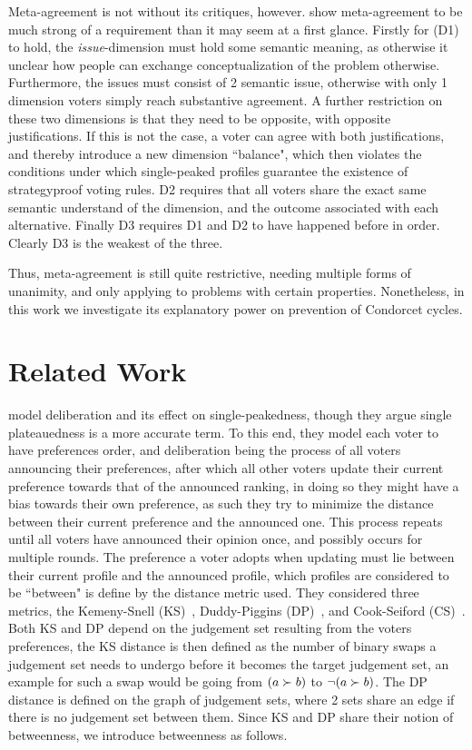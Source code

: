 Meta-agreement is not without its critiques, however. \citet{ottonelliElusiveNotionMetaagreement2013} show meta-agreement to be much strong of a requirement than it may seem at a first glance. Firstly for (D1) to hold, the \textit{issue}-dimension must hold some semantic meaning, as otherwise it unclear how people can exchange conceptualization of the problem otherwise. Furthermore, the issues must consist of 2 semantic issue, otherwise with only 1 dimension voters simply reach substantive agreement. A further restriction on these two dimensions is that they need to be opposite, with opposite justifications. If this is not the case, a voter can agree with both justifications, and thereby introduce a new dimension ``balance", which then violates the conditions under which single-peaked profiles guarantee the existence of strategyproof voting rules. D2 requires that all voters share the exact same semantic understand of the dimension, and the outcome associated with each alternative. Finally D3 requires D1 and D2 to have happened before in order. Clearly D3 is the weakest of the three.

Thus, meta-agreement is still quite restrictive, needing multiple forms of unanimity, and only applying to problems with certain properties. Nonetheless, in this work we investigate its explanatory power on prevention of Condorcet cycles.

\section{Related Work}
\citet{radDeliberationSinglePeakednessCoherent2021a} model deliberation and its effect on single-peakedness, though they argue single plateauedness is a more accurate term. To this end, they model each voter to have preferences order, and deliberation being the process of all voters announcing their preferences, after which all other voters update their current preference towards that of the announced ranking, in doing so they might have a bias towards their own preference, as such they try to minimize the distance between their current preference and the announced one. This process repeats until all voters have announced their opinion once, and possibly occurs for multiple rounds. The preference a voter adopts when updating must lie between their current profile and the announced profile, which profiles are considered to be ``between" is define by the distance metric used. They considered three metrics, the Kemeny-Snell (KS)~\citep{kemeny1962preference}, Duddy-Piggins (DP)~\citep{duddyMeasureDistanceJudgment2012a}, and Cook-Seiford (CS)~\citep{cookPriorityRankingConsensus1978}. Both KS and DP depend on the judgement set resulting from the voters preferences, the KS distance is then defined as the number of binary swaps a judgement set needs to undergo before it becomes the target judgement set, an example for such a swap would be going from $(a \succ b)$ to $\neg (a \succ b)$. The DP distance is defined on the graph of judgement sets, where 2 sets share an edge if there is no judgement set between them. Since KS and DP share their notion of betweenness, we introduce betweenness as follows.

